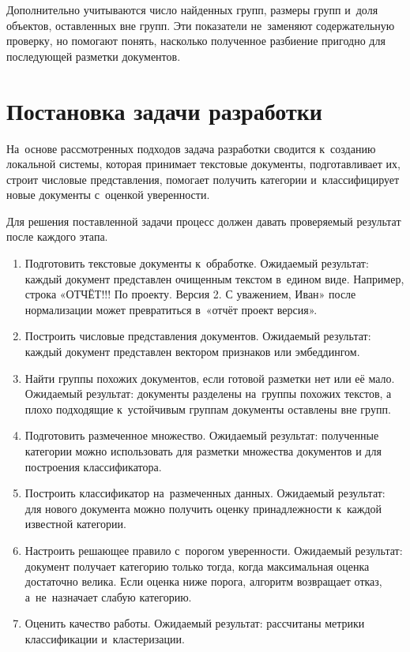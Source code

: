Дополнительно учитываются число найденных групп, размеры групп и~доля объектов,
оставленных вне групп. Эти показатели не~заменяют содержательную проверку, но
помогают понять, насколько полученное разбиение пригодно для последующей
разметки документов.

\section{Постановка задачи разработки}\label{sec:ch1/dev}

На~основе рассмотренных подходов задача разработки сводится к~созданию локальной
системы, которая принимает текстовые документы, подготавливает их, строит
числовые представления, помогает получить категории и~классифицирует новые
документы с~оценкой уверенности.

Для решения поставленной задачи процесс должен давать проверяемый результат
после каждого этапа.

\begin{enumerate}
    \item Подготовить текстовые документы к~обработке. Ожидаемый результат:
        каждый документ представлен очищенным текстом в~едином виде. Например,
        строка «ОТЧЁТ!!! По проекту. Версия 2. С уважением, Иван» после
        нормализации может превратиться в~«отчёт проект версия».
    \item Построить числовые представления документов. Ожидаемый результат:
        каждый документ представлен вектором признаков или эмбеддингом.
    \item Найти группы похожих документов, если готовой разметки нет или её мало.
        Ожидаемый результат: документы разделены на~группы похожих текстов, а
        плохо подходящие к~устойчивым группам документы оставлены вне групп.
    \item Подготовить размеченное множество. Ожидаемый результат: полученные
        категории можно использовать для разметки множества документов
        и для построения классификатора.
    \item Построить классификатор на~размеченных данных. Ожидаемый результат:
        для нового документа можно получить оценку принадлежности к~каждой
        известной категории.
    \item Настроить решающее правило с~порогом уверенности. Ожидаемый результат:
        документ получает категорию только тогда, когда максимальная оценка
        достаточно велика. Если оценка ниже порога, алгоритм возвращает отказ,
        а~не~назначает слабую категорию.
    \item Оценить качество работы. Ожидаемый результат: рассчитаны метрики
        классификации и~кластеризации.
\end{enumerate}

